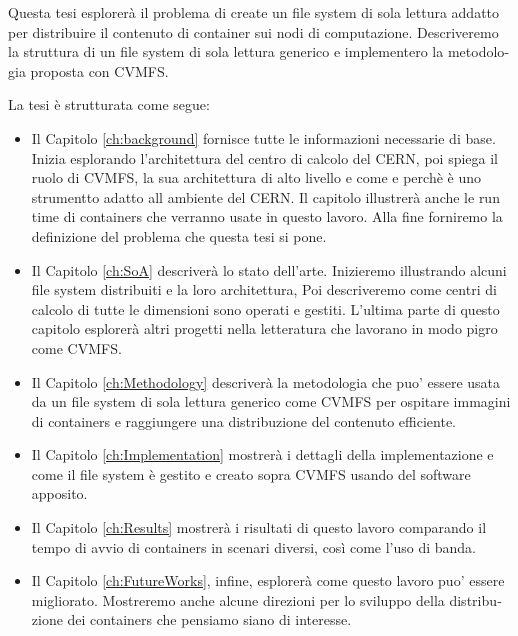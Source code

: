 \begin{otherlanguage}{italian}
Questa tesi esplorerà il problema di create un file system di sola lettura
        addatto per distribuire il contenuto di container sui nodi di
        computazione. Descriveremo la struttura di un file system di sola
        lettura generico e implementero la metodologia proposta con CVMFS.

La tesi è strutturata come segue: 

\begin{itemize} 
        
        \item Il Capitolo \ref{ch:background} fornisce tutte le informazioni
                necessarie di base. Inizia esplorando l'architettura del centro
                di calcolo del CERN, poi spiega il ruolo di CVMFS, la sua
                architettura di alto livello e come e perchè è uno strumentto
                adatto all ambiente del CERN.  Il capitolo illustrerà anche le
                run time di containers che verranno usate in questo lavoro.
                Alla fine forniremo la definizione del problema che questa tesi
                si pone.  
        
        \item Il Capitolo \ref{ch:SoA} descriverà lo stato dell'arte.
                Inizieremo illustrando alcuni file system distribuiti e la loro
                architettura, Poi descriveremo come centri di calcolo di tutte
                le dimensioni sono operati e gestiti. L'ultima parte di questo
                capitolo esplorerà altri progetti nella letteratura che
                lavorano in modo pigro come CVMFS.

        \item Il Capitolo \ref{ch:Methodology} descriverà la metodologia che
                puo' essere usata da un file system di sola lettura generico
                come CVMFS per ospitare immagini di containers e raggiungere
                una distribuzione del contenuto efficiente.

        \item Il Capitolo \ref{ch:Implementation} mostrerà i dettagli della
                implementazione e come il file system è gestito e creato sopra
                CVMFS usando del software apposito.
                
        \item Il Capitolo \ref{ch:Results} mostrerà i risultati di questo
                lavoro comparando il tempo di avvio di containers in scenari
                diversi, così come l'uso di banda.

        \item Il Capitolo \ref{ch:FutureWorks}, infine, esplorerà come questo
                lavoro puo' essere migliorato. Mostreremo anche alcune
                direzioni per lo sviluppo della distribuzione dei containers
                che pensiamo siano di interesse.

\end{itemize}




\end{otherlanguage}

\endgroup

\vfill
